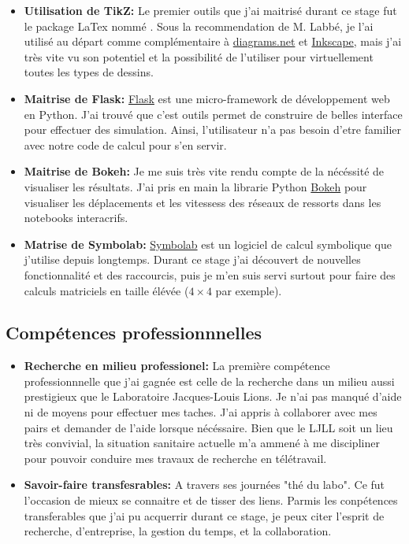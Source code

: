 \begin{itemize}
   \item \textbf{Utilisation de TikZ:} Le premier outils que j'ai maitrisé durant ce stage fut le package LaTex nommé . Sous la recommendation de M. Labbé, je l'ai utilisé au départ comme complémentaire à \href{https://www.diagrams.net/}{diagrams.net} et \href{https://inkscape.org/about/}{Inkscape}, mais j'ai très vite vu son potentiel et la possibilité de l'utiliser pour virtuellement toutes les types de dessins.
   \item \textbf{Maitrise de Flask:} \href{https://flask.palletsprojects.com/en/2.0.x/}{Flask} est une micro-framework de développement web en Python. J'ai trouvé que c'est outils permet de construire de belles interface pour effectuer des simulation. Ainsi, l'utilisateur n'a pas besoin d'etre familier avec notre code de calcul pour s'en servir. 
   \item \textbf{Maitrise de Bokeh:} Je me suis très vite rendu compte de la nécéssité de visualiser les résultats. J'ai pris en main la librarie Python \href{https://bokeh.org/}{Bokeh} pour visualiser les déplacements et les vitessess des réseaux de ressorts dans les notebooks interacrifs. 
   \item \textbf{Matrise de Symbolab:} \href{https://www.symbolab.com/}{Symbolab} est un logiciel de calcul symbolique que j'utilise depuis longtemps. Durant ce stage j'ai découvert de nouvelles fonctionnalité et des raccourcis, puis je m'en suis servi surtout pour faire des calculs matriciels en taille élévée ($4\times 4$ par exemple). 
\end{itemize}





\subsection{Compétences professionnnelles}

\begin{itemize}
    \item \textbf{Recherche en milieu professionel:} La première compétence professionnnelle que j'ai gagnée est celle de la recherche dans un milieu aussi prestigieux que le Laboratoire Jacques-Louis Lions. Je n'ai pas manqué d'aide ni de moyens pour effectuer mes taches. J'ai appris à collaborer avec mes pairs et demander de l'aide lorsque nécéssaire. Bien que le LJLL soit un lieu très convivial, la situation sanitaire actuelle m'a ammené à me discipliner pour pouvoir conduire mes travaux de recherche en télétravail.
    \item \textbf{Savoir-faire transfesrables:} A travers ses journées "thé du labo". Ce fut l'occasion de mieux se connaitre et de tisser des liens. Parmis les conpétences transferables que j'ai pu acquerrir durant ce stage, je peux citer l'esprit de recherche, d'entreprise, la gestion du temps, et la collaboration.
\end{itemize}